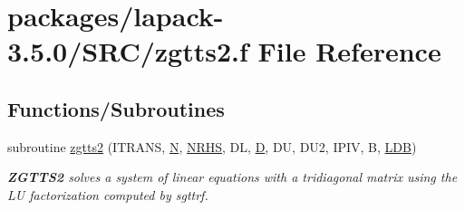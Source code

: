 \hypertarget{zgtts2_8f}{}\section{packages/lapack-\/3.5.0/\+S\+R\+C/zgtts2.f File Reference}
\label{zgtts2_8f}
\subsection*{Functions/\+Subroutines}
\begin{DoxyCompactItemize}
\item 
subroutine \hyperlink{group__complex16GTcomputational_ga11d60b5dc29a0f78c56fea7e602ae5b7}{zgtts2} (I\+T\+R\+A\+N\+S, \hyperlink{polmisc_8c_a0240ac851181b84ac374872dc5434ee4}{N}, \hyperlink{example__user_8c_aa0138da002ce2a90360df2f521eb3198}{N\+R\+H\+S}, D\+L, \hyperlink{odrpack_8h_a7dae6ea403d00f3687f24a874e67d139}{D}, D\+U, D\+U2, I\+P\+I\+V, B, \hyperlink{example__user_8c_a50e90a7104df172b5a89a06c47fcca04}{L\+D\+B})
\begin{DoxyCompactList}\small\item\em {\bfseries Z\+G\+T\+T\+S2} solves a system of linear equations with a tridiagonal matrix using the L\+U factorization computed by sgttrf. \end{DoxyCompactList}\end{DoxyCompactItemize}
